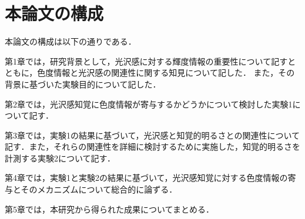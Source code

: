     \section{本論文の構成}
        本論文の構成は以下の通りである．

        第1章では，研究背景として，光沢感に対する輝度情報の重要性について記すとともに，色度情報と光沢感の関連性に関する知見について記した．
        また，その背景に基づいた実験目的について記した．

        第2章では，光沢感知覚に色度情報が寄与するかどうかについて検討した実験1について記す．

        第3章では，実験1の結果に基づいて，光沢感と知覚的明るさとの関連性について記す．また，それらの関連性を詳細に検討するために実施した，知覚的明るさを計測する実験2について記す．

        第4章では，実験1と実験2の結果に基づいて，光沢感知覚に対する色度情報の寄与とそのメカニズムについて総合的に論ずる．

        第5章では，本研究から得られた成果についてまとめる．

    \newpage